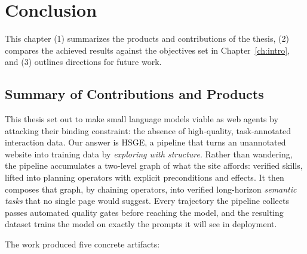 \chapter{Conclusion}
\label{ch:conclusion}

This chapter (1) summarizes the products and contributions of the thesis,
(2) compares the achieved results against the objectives set in
Chapter~\ref{ch:intro}, and (3) outlines directions for future work.

\section{Summary of Contributions and Products}
\label{sec:conc-summary}

This thesis set out to make small language models viable as web agents by
attacking their binding constraint: the absence of high-quality,
task-annotated interaction data. Our answer is HSGE, a pipeline that turns
an unannotated website into training data by \emph{exploring with
structure}. Rather than wandering, the pipeline accumulates a two-level
graph of what the site affords: verified skills, lifted into planning
operators with explicit preconditions and effects. It then composes that
graph, by chaining operators, into verified long-horizon \emph{semantic
tasks} that no single page would suggest. Every trajectory the pipeline
collects passes automated quality gates before reaching the model, and the
resulting dataset trains the model on exactly the prompts it will see in
deployment.

The work produced five concrete artifacts:

